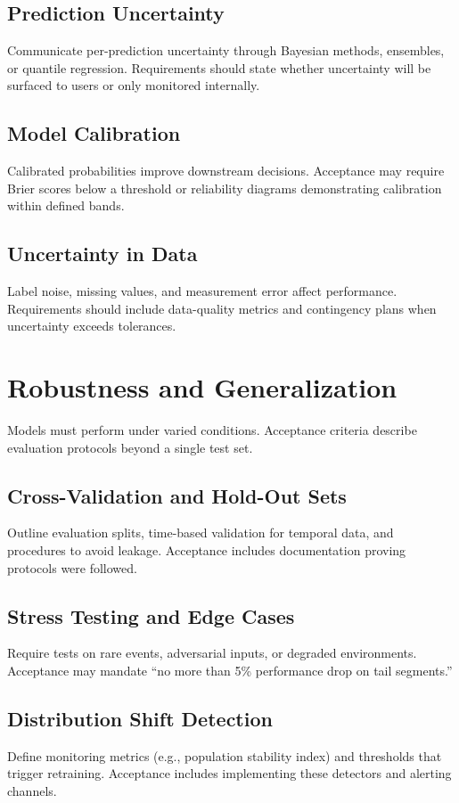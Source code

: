 \subsection{Prediction Uncertainty}
Communicate per-prediction uncertainty through Bayesian methods, ensembles, or quantile regression. Requirements should state whether uncertainty will be surfaced to users or only monitored internally.

\subsection{Model Calibration}
Calibrated probabilities improve downstream decisions. Acceptance may require Brier scores below a threshold or reliability diagrams demonstrating calibration within defined bands.

\subsection{Uncertainty in Data}
Label noise, missing values, and measurement error affect performance. Requirements should include data-quality metrics and contingency plans when uncertainty exceeds tolerances.

\section{Robustness and Generalization}
\label{sec:robustness}

Models must perform under varied conditions. Acceptance criteria describe evaluation protocols beyond a single test set.

\subsection{Cross-Validation and Hold-Out Sets}
Outline evaluation splits, time-based validation for temporal data, and procedures to avoid leakage. Acceptance includes documentation proving protocols were followed.

\subsection{Stress Testing and Edge Cases}
Require tests on rare events, adversarial inputs, or degraded environments. Acceptance may mandate ``no more than 5\% performance drop on tail segments.''

\subsection{Distribution Shift Detection}
Define monitoring metrics (e.g., population stability index) and thresholds that trigger retraining. Acceptance includes implementing these detectors and alerting channels.

